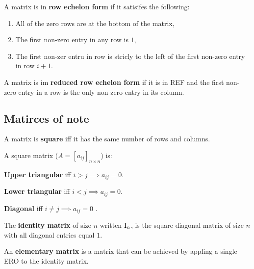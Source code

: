 \begin{definition}
    A matrix is in \textbf{row echelon form} if it satisifes the following: \begin{enumerate}
        \item All of the zero rows are at the bottom of the matrix,
        \item The first non-zero entry in any row is $1$,
        \item The first non-zer entru in row is stricly to the left of the first non-zero entry in row $i+1$.
    \end{enumerate}
\end{definition}

\begin{definition}
    A matrix is im \textbf{reduced row echelon form} if it is in REF and the first non-zero entry in a row is the only non-zero entry in its column.
\end{definition}

\subsection{Matirces of note}

\begin{definition}
    A matrix is \textbf{square} iff it has the same number of rows and columns.
\end{definition}

\begin{definition}
    A square matrix ($A = [a_{ij}]_{n\times n}$) is: \begin{enumerate*}
        \item \textbf{Upper triangular} iff $i>j \implies a_{ij}=0$.
        \item \textbf{Lower triangular} iff $i<j \implies a_{ij}=0$.
        \item \textbf{Diagonal} iff $i\neq j \implies a_{ij}=0$ .
    \end{enumerate*}
\end{definition}

\begin{definition}
    The \textbf{identity matrix} of size $n$ written $\mathrm{I}_{n}$, is the square diagonal matrix of size $n$ with all diagonal entries equal $1$.
\end{definition}

\begin{definition}
    An \textbf{elementary matrix} is a matrix that can be achieved by appling a single ERO to the identity matrix.
\end{definition}

